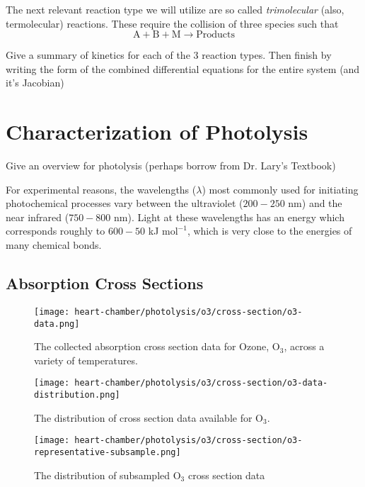 The next relevant reaction type we will utilize are so called \textit{trimolecular} (also, termolecular) reactions. These require the collision of three species such that
\begin{equation}
  \mathrm{A} + \mathrm{B} + \mathrm{M} \longrightarrow \text{Products}
\end{equation}



Give a summary of kinetics for each of the 3 reaction types. Then finish by writing the form of the combined differential equations for the entire system (and it's Jacobian)



\section{Characterization of Photolysis}



Give an overview for photolysis (perhaps borrow from Dr. Lary's Textbook)

For experimental reasons, the wavelengths ($\lambda$) most commonly used for initiating photochemical processes vary between the ultraviolet ($200-250$ nm) and the near infrared ($750-800$ nm). Light at these wavelengths has an energy which corresponds roughly to $600-50 $ kJ $\text{mol}^{-1}$, which is very close to the energies of many chemical bonds.




\subsection{Absorption Cross Sections}

\begin{figure}[h]
  \centering
  \texttt{[image: heart-chamber/photolysis/o3/cross-section/o3-data.png]}
  \caption{The collected absorption cross section data for Ozone, $\mathrm{O_3}$, across a variety of temperatures.}
  \label{fig:cs-o3-data}
\end{figure}

\begin{figure}[h]
  \centering
  \texttt{[image: heart-chamber/photolysis/o3/cross-section/o3-data-distribution.png]}
  \caption{The distribution of cross section data available for $\mathrm{O_3}$.}
  \label{fig:cs-o3-dist}
\end{figure}

\begin{figure}[h]
  \centering
  \texttt{[image: heart-chamber/photolysis/o3/cross-section/o3-representative-subsample.png]}
  \caption{The distribution of subsampled $\mathrm{O}_3$ cross section data}
  \label{fig:cs-o3-repr}
\end{figure}

